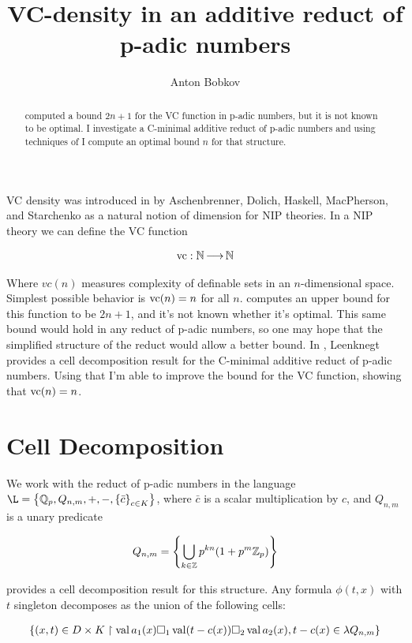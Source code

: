 \documentclass{amsart}
\title{VC-density in an additive reduct of p-adic numbers}
\author{Anton Bobkov}
\newcommand{\curly}[1]{\left\{#1\right\}}
\DeclareMathOperator{\val}{val}
\begin{document}
\begin{abstract}
	\cite{density} computed a bound $2n+1$ for the VC function in p-adic numbers, but it is not known to be optimal.
	I investigate a C-minimal additive reduct of p-adic numbers and using techniques of \cite{reduct} I compute an optimal bound $n$ for that structure.
\end{abstract}


\maketitle

VC density was introduced in \cite{density} by Aschenbrenner, Dolich, Haskell, MacPherson, and Starchenko as a natural notion of dimension for NIP theories.
In a NIP theory we can define the VC function

\begin{align*}
	\operatorname{vc} : \mathbb{N} \operatorname{\longrightarrow} \mathbb{N}
\end{align*}

Where $vc(n)$ measures complexity of definable sets in an $n$-dimensional space.
Simplest possible behavior is $\operatorname{vc}(n) = n$ for all $n$.
\cite{density} computes an upper bound for this function to be $2n+1$, and it's not known whether it's optimal.
This same bound would hold in any reduct of p-adic numbers, so one may hope that the simplified structure of the reduct would allow a better bound.
In \cite{reduct}, Leenknegt provides a cell decomposition result for the C-minimal additive reduct of p-adic numbers.
Using that I'm able to improve the bound for the VC function, showing that $\operatorname{vc}(n) = n$.

\section{Cell Decomposition}
We work with the reduct of p-adic numbers in the language $\L = \curly{\Q_p, Q_{n,m}, +, -, \curly{\bar c}_{c \in K} }$,
where $\bar c$ is a scalar multiplication by $c$, and $Q_{n,m}$ is a unary predicate

\begin{align*}
	Q_{n,m} = \curly{\bigcup_{k \in \Z} p^{kn} (1 + p^m\Z_p) }
\end{align*}

\cite{reject} provides a cell decomposition result for this structure.
Any formula $\phi(t, x)$  with $t$  singleton decomposes as the union of the following cells:

\begin{align*}
	\curly{(x, t) \in D \times K \midr \val a_1(x) \square_1 \val (t - c(x)) \square_2 \val a_2(x), t - c(x) \in \lambda Q_{n,m} }
\end{align*}
\end{document}
